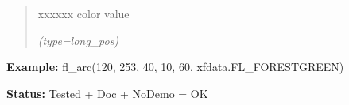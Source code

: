 \begin{boxedminipage}{\funcwidth}
\begin{quote}
\begin{Ventry}{xxxxxx}
          color value

            {\it (type=long\_pos)}

        \end{Ventry}

      \end{quote}

\textbf{Example:} fl\_arc(120, 253, 40, 10, 60, xfdata.FL\_FORESTGREEN)



\textbf{Status:} Tested + Doc + NoDemo = OK



    \end{boxedminipage}

    \label{xformslib:flxbasic:fl_drw_frame}

    \vspace{0.5ex}

